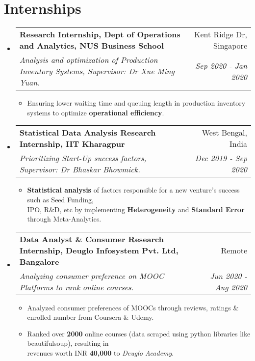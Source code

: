 \documentclass[a4paper,20pt]{article}
\makeatletter
\newcommand{\resumeItem}[2]{
  \item\small{
    {#1}{#2 \vspace{-2pt}}
  }
}
\newcommand{\resumeSubheading}[4]{
  \vspace{-1pt}\item
    \begin{tabular*}{0.97\textwidth}{l@{\extracolsep{\fill}}r}
      \textbf{#1} & #2 \\
      \textit{#3} & \textit{#4} \\
    \end{tabular*}\vspace{-5pt}
}
\newcommand{\resumeSubHeadingListStart}{\begin{itemize}[leftmargin=*]}
\newcommand{\resumeSubHeadingListEnd}{\end{itemize}}
\newcommand{\resumeItemListStart}{\begin{itemize}}
\newcommand{\resumeItemListEnd}{\end{itemize}\vspace{-2.2pt}}
\makeatother
\begin{document}
\section{Internships}
  \resumeSubHeadingListStart
    \resumeSubheading{Research Internship, Dept of Operations and Analytics, NUS Business School}{Kent Ridge Dr, Singapore}
    {Analysis and optimization of Production Inventory Systems, \small{Supervisor: Dr Xue Ming Yuan.}}{Sep 2020 - Jan 2020}
    \resumeItemListStart[leftmargin=*]
        \resumeItem{}
          {Ensuring lower waiting time and queuing length in  production inventory systems to optimize \textbf{operational efficiency}.}
        \resumeItemListEnd
    \resumeSubheading{Statistical Data Analysis Research Internship, IIT Kharagpur }{West Bengal, India}
    {Prioritizing Start-Up success factors, \small{Supervisor: Dr Bhaskar Bhowmick.}}{Dec 2019 - Sep 2020}
    \resumeItemListStart[leftmargin=*]
        \resumeItem{}
          {\textbf{Statistical analysis} of factors responsible for a new venture’s success  such as Seed Funding, \\ IPO, R\&D, etc  by implementing \textbf{Heterogeneity} and \textbf{Standard Error} through Meta-Analytics.}
        \resumeItemListEnd
\vspace{-1pt}
    \resumeSubheading
		{Data Analyst \& Consumer Research Internship, Deuglo Infosystem Pvt. Ltd, Bangalore}{Remote}
		{Analyzing consumer preference on MOOC Platforms to rank online courses.}{Jun 2020 -  Aug 2020}
		\resumeItemListStart[leftmargin=*]
        \resumeItem{}
          {Analyzed consumer preferences of MOOCs through reviews, ratings \& enrolled number from Coursera \& Udemy.}
        \resumeItem{}
          {Ranked over \textbf{2000} online courses (data scraped using python libraries like beautifulsoup), resulting in\\ revenues worth  INR \textbf{40,000} to \emph{Deuglo Academy}.}  
        \resumeItemListEnd
\vspace{-4pt}
\resumeSubHeadingListEnd
\end{document}
